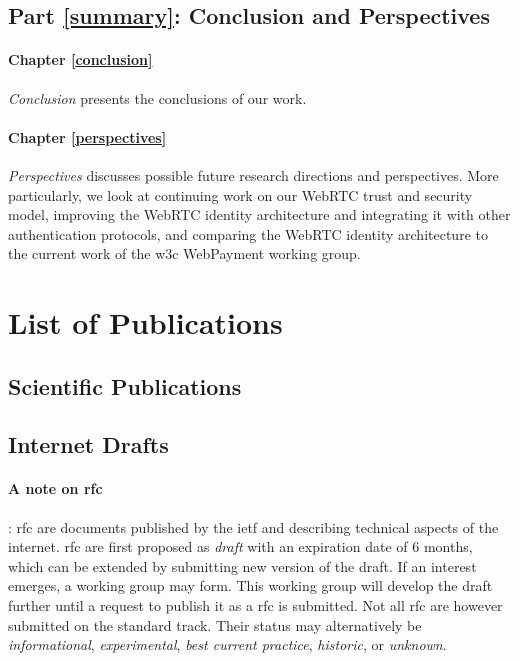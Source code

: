 \subsection*{Part \ref{summary}: Conclusion and Perspectives}
\paragraph{Chapter \ref{conclusion}} \textit{Conclusion} presents the conclusions of our work.

\paragraph{Chapter \ref{perspectives}} \textit{Perspectives} discusses possible future research directions and perspectives. 
More particularly, we look at continuing work on our WebRTC trust and security model, improving the WebRTC identity architecture and integrating it with other authentication protocols, and comparing the WebRTC identity architecture to the current work of the \gls{w3c} WebPayment working group.

\section*{List of Publications}

\subsection*{Scientific Publications}
\begin{description}
\item \cite{corre_webrtc_2017} 
\item \cite{corre_whyusers_2017} 
\item \cite{javed_cross-domain_2017} 
\end{description}

\subsection*{Internet Drafts}
\begin{description}
\item \cite{I-D.copeland-rtcweb-p2p-idp-auth} 
\end{description}

\paragraph{A note on \gls{rfc}}: \gls{rfc} are documents published by the \gls{ietf} and describing technical aspects of the internet.
\gls{rfc} are first proposed as \textit{draft} with an expiration date of 6 months, which can be extended by submitting new version of the draft.
If an interest emerges, a working group may form.
This working group will develop the draft further until a request to publish it as a \gls{rfc} is submitted.
Not all \gls{rfc} are however submitted on the standard track.
Their status may alternatively be \textit{informational}, \textit{experimental}, \textit{best current practice}, \textit{historic}, or \textit{unknown}.

